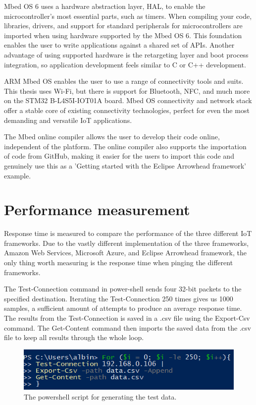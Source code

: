 Mbed OS 6 uses a hardware abstraction layer, HAL, to enable the microcontroller's most essential parts, such as timers.
When compiling your code,  libraries, drivers, and support for standard peripherals for microcontrollers are imported when using hardware supported by the Mbed OS 6.
This foundation enables the user to write applications against a shared set of APIs.
Another advantage of using supported hardware is the retargeting layer and boot process integration, so application development feels similar to C or C++ development.

ARM Mbed OS enables the user to use a range of connectivity tools and suits. This thesis uses Wi-Fi, but there is support for Bluetooth, NFC, and much more on the STM32 B-L4S5I-IOT01A board.
Mbed OS connectivity and network stack offer a stable core of existing connectivity technologies, perfect for even the most demanding and versatile IoT applications. 

The Mbed online compiler allows the user to develop their code online, independent of the platform. 
The online compiler also supports the importation of code from GitHub, making it easier for the users to import this code and genuinely use this as a 'Getting started with the Eclipse Arrowhead framework' example. 


\section{Performance measurement}
Response time is measured to compare the performance of the three different IoT frameworks.  
Due to the vastly different implementation of the three frameworks, Amazon Web Services, Microsoft Azure, and Eclipse Arrowhead framework, the only thing worth measuring is the response time when pinging the different frameworks.

The Test-Connection command in power-shell sends four 32-bit packets to the specified destination. 
Iterating the Test-Connection 250 times gives us 1000 samples, a sufficient amount of attempts to produce an average response time.
The results from the Test-Connection is saved in a .csv file using the Export-Csv command. 
The Get-Content command then imports the saved data from the .csv file to keep all results through the whole loop.
\begin{figure}[H]
    \centering
    \includegraphics[width=\textwidth]{Pictures/powershell.png} 
    \caption{The powershell script for generating the test data.}
    \label{powershell}
\end{figure}

